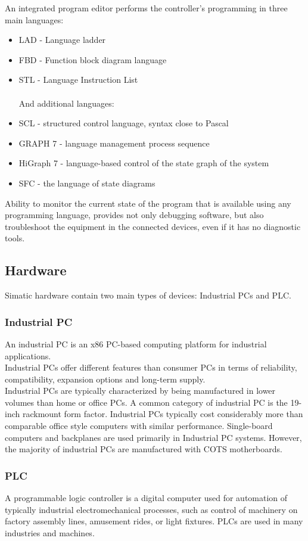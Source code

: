 \documentclass[english]{article}
\begin{document}
An integrated program editor performs the controller’s programming in three main languages:
\begin{itemize}
\item LAD - Language ladder
\item FBD - Function block diagram language
\item STL - Language Instruction List\\\\
And additional languages:
\item SCL - structured control language, syntax close to Pascal
\item GRAPH 7 - language management process sequence
\item HiGraph 7 - language-based control of the state graph of the system
\item SFC - the language of state diagrams
\end{itemize}

Ability to monitor the current state of the program that is available using any programming language, provides not only debugging software, but also troubleshoot the equipment in the connected devices, even if it has no diagnostic tools.


\subsection{Hardware}
Simatic hardware contain two main types of devices: Industrial PCs and PLC.
\subsubsection{Industrial PC}
An industrial PC is an x86 PC-based computing platform for industrial applications.\\

Industrial PCs offer different features than consumer PCs in terms of reliability, compatibility, expansion options and long-term supply.\\

Industrial PCs are typically characterized by being manufactured in lower volumes than home or office PCs. A common category of industrial PC is the 19-inch rackmount form factor. Industrial PCs typically cost considerably more than comparable office style computers with similar performance. Single-board computers and backplanes are used primarily in Industrial PC systems. However, the majority of industrial PCs are manufactured with COTS motherboards.
\subsubsection{PLC}
A programmable logic controller is a digital computer used for automation of typically industrial electromechanical processes, such as control of machinery on factory assembly lines, amusement rides, or light fixtures. PLCs are used in many industries and machines.\\
\end{document}
